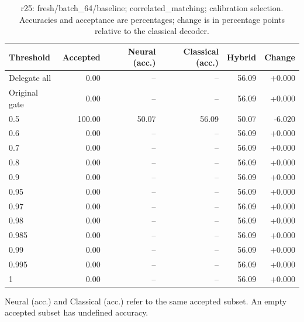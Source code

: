 \begin{table}[htbp]
\centering\small
\setlength{\tabcolsep}{3pt}
\caption{r25: fresh/batch\_64/baseline; correlated\_matching; calibration selection. Accuracies and acceptance are percentages; change is in percentage points relative to the classical decoder.}
\begin{tabular}{lrrrrr}
\toprule
Threshold & Accepted & Neural (acc.) & Classical (acc.) & Hybrid & Change \\
\midrule
Delegate all & 0.00 & -- & -- & 56.09 & +0.000 \\
Original gate & 0.00 & -- & -- & 56.09 & +0.000 \\
0.5 & 100.00 & 50.07 & 56.09 & 50.07 & -6.020 \\
0.6 & 0.00 & -- & -- & 56.09 & +0.000 \\
0.7 & 0.00 & -- & -- & 56.09 & +0.000 \\
0.8 & 0.00 & -- & -- & 56.09 & +0.000 \\
0.9 & 0.00 & -- & -- & 56.09 & +0.000 \\
0.95 & 0.00 & -- & -- & 56.09 & +0.000 \\
0.97 & 0.00 & -- & -- & 56.09 & +0.000 \\
0.98 & 0.00 & -- & -- & 56.09 & +0.000 \\
0.985 & 0.00 & -- & -- & 56.09 & +0.000 \\
0.99 & 0.00 & -- & -- & 56.09 & +0.000 \\
0.995 & 0.00 & -- & -- & 56.09 & +0.000 \\
1 & 0.00 & -- & -- & 56.09 & +0.000 \\
\bottomrule
\end{tabular}
\par\smallskip\footnotesize Neural (acc.) and Classical (acc.) refer to the same accepted subset. An empty accepted subset has undefined accuracy.
\end{table}
